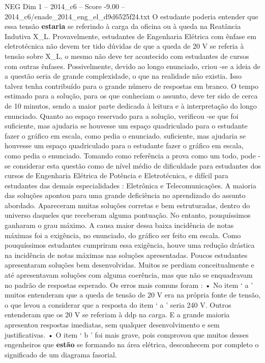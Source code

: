 \begin{textsample}{NEG Dim 1 – 2014\_c6 – Score -9.00 – 2014\_c6/enade\_2014\_eng\_el\_d9d6525f24.txt}
O estudante poderia entender que essa tensão \textbf{estaria} se referindo à carga da oficina ou à queda na Reatância Indutiva X\_L.
Provavelmente, estudantes de Engenharia Elétrica com ênfase em eletrotécnica não devem ter tido dúvidas de que a queda de 20 V se referia à tensão sobre X\_L, o mesmo não deve ter acontecido com estudantes de cursos com outras ênfases.
Possivelmente, devido ao longo enunciado, criou -se a ideia de a questão seria de grande complexidade, o que na realidade não existia.
Isso talvez tenha contribuído para o grande número de respostas em branco.
O tempo estimado para a solução, para os que conheciam o assunto, deve ter sido de cerca de 10 minutos, sendo a maior parte dedicada à leitura e à interpretação do longo enunciado.
Quanto ao espaço reservado para a solução, verificou -se que foi suficiente, mas ajudaria se houvesse um espaço quadriculado para o estudante fazer o gráfico em escala, como pedia o enunciado. suficiente, mas ajudaria se houvesse um espaço quadriculado para o estudante fazer o gráfico em escala, como pedia o enunciado.
Tomando como referência a prova como um todo, pode -se considerar esta questão como de nível médio de dificuldade para estudantes dos cursos de Engenharia Elétrica de Potência e Eletrotécnica, e difícil para estudantes das demais especialidades : Eletrônica e Telecomunicações.
A maioria das soluções apontou para uma grande deficiência no aprendizado do assunto abordado.
Apareceram muitas soluções corretas e bem estruturadas, dentro do universo daqueles que receberam alguma pontuação.
No entanto, pouquíssimos ganharam o grau máximo.
A causa maior dessa baixa incidência de notas máximas foi a exigência, no enunciado, do gráfico ser feito em escala.
Como pouquíssimos estudantes cumpriram essa exigência, houve uma redução drástica na incidência de notas máximas nas soluções apresentadas.
Poucos estudantes apresentaram soluções bem desenvolvidas.
Muitos se perdiam conceitualmente e até apresentavam soluções com alguma coerência, mas que não se enquadravam no padrão de respostas esperado.
Os erros mais comuns foram : • No item ‘ a ’ muitos entenderam que a queda de tensão de 20 V era na própria fonte de tensão, o que levou a considerar que a resposta do item ‘ a ’ seria 240 V.
Outros entenderam que os 20 V se referiam à ddp na carga.
E a grande maioria apresentou respostas imediatas, sem qualquer desenvolvimento e sem justificativas. • O item ‘ b ’ foi mais grave, pois comprovou que muitos desses engenheiros que \textbf{estão} se formando na área elétrica, desconhecem por completo o significado de um diagrama fasorial.

\end{textsample}
